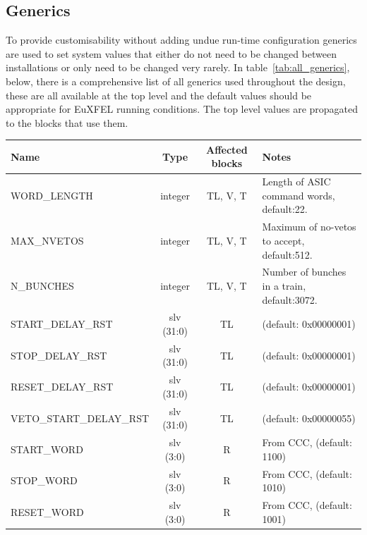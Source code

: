 \subsection{Generics} %
\label{sub:top_generics}
To provide customisability without adding undue run-time configuration generics are used to set system values that either do not need to be changed between installations or only need to be changed very rarely. In table~\ref{tab:all_generics}, below, there is a comprehensive list of all generics used throughout the design, these are all available at the top level and the default values should be appropriate for EuXFEL running conditions. The top level values are propagated to the blocks that use them. 
\begin{table}
  \begin{center}
    \begin{tabulary}{\textwidth}{l| c | c | L}
      Name                       & Type       & Affected blocks & Notes \\
      \hline
      WORD\_LENGTH               & integer    & TL, V, T        & Length of ASIC command words, default:22.    \\
      MAX\_NVETOS                & integer    & TL, V, T        & Maximum of no-vetos to accept, default:512.  \\
      N\_BUNCHES                 & integer    & TL, V, T        & Number of bunches in a train, default:3072.  \\ 
      \hline
      START\_DELAY\_RST          & slv (31:0) & TL              & (default: 0x00000001)                \\
      STOP\_DELAY\_RST           & slv (31:0) & TL              & (default: 0x00000001)                \\
      RESET\_DELAY\_RST          & slv (31:0) & TL              & (default: 0x00000001)                \\
      VETO\_START\_DELAY\_RST    & slv (31:0) & TL              & (default: 0x00000055)                \\
      \hline                                                        
      START\_WORD                & slv (3:0)  &  R              & From CCC, (default: 1100)           \\
      STOP\_WORD                 & slv (3:0)  &  R              & From CCC, (default: 1010)           \\
      RESET\_WORD                & slv (3:0)  &  R              & From CCC, (default: 1001)           \\

\end{tabulary}
\end{center}
\end{table}
